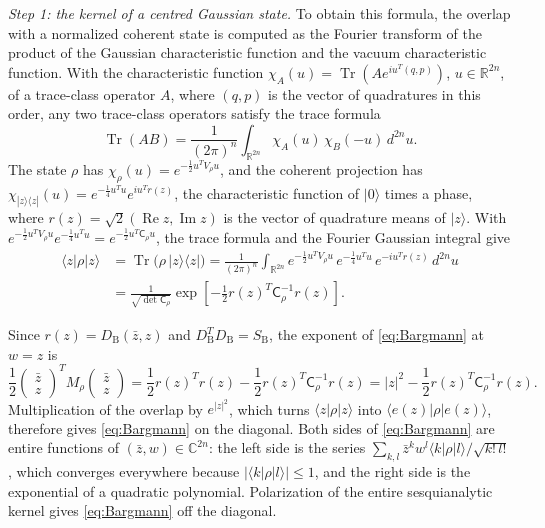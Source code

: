 \documentclass[11pt]{amsart}
\numberwithin{equation}{section}
\theoremstyle{definition}
\newcommand{\R}{\mathbb R}
\newcommand{\C}{\mathbb C}
\newcommand{\Tr}{\operatorname{Tr}}
\newcommand{\Rea}{\operatorname{Re}}
\newcommand{\Ima}{\operatorname{Im}}
\begin{document}
\smallskip
\emph{Step 1: the kernel of a centred Gaussian state.}
To obtain this formula, the overlap with a normalized coherent state
is computed as the Fourier transform of the product of the Gaussian
characteristic function and the vacuum characteristic function. With
the characteristic function \(\chi_A(u)=\Tr(Ae^{iu^T(q,p)})\),
\(u\in\R^{2n}\), of a trace-class operator \(A\), where \((q,p)\) is the
vector of quadratures in this order, any two trace-class operators
satisfy the trace formula
\[
 \Tr(AB)=\frac1{(2\pi)^n}\int_{\R^{2n}}\chi_A(u)\,\chi_B(-u)\,d^{2n}u.
\]
The state \(\rho\) has \(\chi_\rho(u)=e^{-\frac12u^TV_\rho u}\), and the
coherent projection has
\(\chi_{|z\rangle\langle z|}(u)=e^{-\frac14u^Tu}e^{iu^Tr(z)}\), the
characteristic function of \(|0\rangle\) times a phase, where
\(r(z)=\sqrt2(\Rea z,\Ima z)\) is the vector of quadrature means of
\(|z\rangle\). With
\(e^{-\frac12u^TV_\rho u}e^{-\frac14u^Tu}=e^{-\frac12u^T\mathsf C_\rho u}\),
the trace formula and the Fourier Gaussian integral give
\begin{align*}
 \langle z|\rho|z\rangle
 &=\Tr\bigl(\rho\,|z\rangle\langle z|\bigr)
 =\frac1{(2\pi)^n}\int_{\R^{2n}}
   e^{-\frac12u^TV_\rho u}\,e^{-\frac14u^Tu}\,e^{-iu^Tr(z)}\,d^{2n}u\\
 &=\frac1{\sqrt{\det\mathsf C_\rho}}
 \exp[-\tfrac12 r(z)^T\mathsf C_\rho^{-1}r(z)].
\end{align*}

Since \(r(z)=D_{\mathrm B}(\bar z,z)\) and
\(D_{\mathrm B}^TD_{\mathrm B}=S_{\mathrm B}\), the exponent of
\eqref{eq:Bargmann} at \(w=z\) is
\[
 \frac12
 \begin{pmatrix}\bar z\\z\end{pmatrix}^{\!T}
 M_\rho
 \begin{pmatrix}\bar z\\z\end{pmatrix}
 =\frac12r(z)^Tr(z)-\frac12r(z)^T\mathsf C_\rho^{-1}r(z)
 =|z|^2-\frac12r(z)^T\mathsf C_\rho^{-1}r(z).
\]
Multiplication of the overlap by \(e^{|z|^2}\), which turns
\(\langle z|\rho|z\rangle\) into \(\langle e(z)|\rho|e(z)\rangle\),
therefore gives \eqref{eq:Bargmann} on the diagonal. Both sides of
\eqref{eq:Bargmann} are entire functions of \((\bar z,w)\in\C^{2n}\):
the left side is the series
\(\sum_{k,l}\bar z^kw^l\langle k|\rho|l\rangle/\sqrt{k!\,l!}\), which
converges everywhere because \(|\langle k|\rho|l\rangle|\le1\), and the
right side is the exponential of a quadratic polynomial.
Polarization of the entire sesquianalytic kernel gives
\eqref{eq:Bargmann} off the diagonal.
\end{document}
